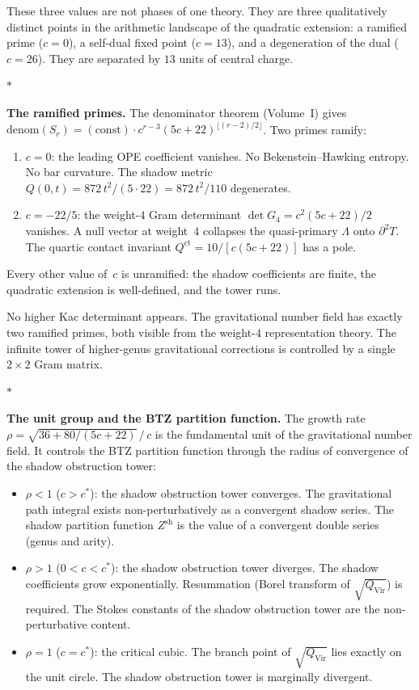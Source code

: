 \documentclass[11pt]{article}
\newcommand{\sep}{\bigskip\begin{center}$*$\end{center}\medskip}
\begin{document}
These three values are not phases of one theory.  They are three
qualitatively distinct points in the arithmetic landscape of the
quadratic extension: a ramified prime ($c = 0$), a self-dual
fixed point ($c = 13$), and a degeneration of the dual
($c = 26$).  They are separated by $13$ units of central charge.

\sep

\noindent\textbf{The ramified primes.}\enspace
The denominator theorem (Volume~I) gives
$\mathrm{denom}(S_r)
= (\mathrm{const})\cdot c^{r-3}(5c{+}22)^{\lfloor(r-2)/2\rfloor}$.
Two primes ramify:
\begin{enumerate}[label=(\roman*),nosep]
\item $c = 0$: the leading OPE coefficient vanishes.  No
  Bekenstein--Hawking entropy.  No bar curvature.  The shadow
  metric $Q(0,t) = 872\,t^2/(5 \cdot 22) = 872\,t^2/110$
  degenerates.
\item $c = -22/5$: the weight-$4$ Gram determinant
  $\det G_4 = c^2(5c{+}22)/2$ vanishes.  A null vector at
  weight~$4$ collapses the quasi-primary $\Lambda$ onto
  $\partial^2 T$.  The quartic contact invariant
  $Q^{\mathrm{ct}} = 10/[c(5c{+}22)]$ has a pole.
\end{enumerate}
Every other value of~$c$ is unramified: the shadow
coefficients are finite, the quadratic extension is
well-defined, and the tower runs.

No higher Kac determinant appears.  The gravitational number
field has exactly two ramified primes, both visible from the
weight-$4$ representation theory.  The infinite tower of
higher-genus gravitational corrections is controlled by a
single $2 \times 2$ Gram matrix.

\sep

\noindent\textbf{The unit group and the BTZ partition function.}\enspace
The growth rate
$\rho = \sqrt{36 + 80/(5c{+}22)}\,/\,c$ is the fundamental
unit of the gravitational number field.  It controls the BTZ
partition function through the radius of convergence of the
shadow obstruction tower:
\begin{itemize}[nosep]
\item $\rho < 1$ ($c > c^*$): the shadow obstruction tower converges.  The
  gravitational path integral exists non-perturbatively as a
  convergent shadow series.  The shadow partition function
  $Z^{\mathrm{sh}}$ is the value of a convergent double series
  (genus and arity).
\item $\rho > 1$ ($0 < c < c^*$): the shadow obstruction tower diverges.
  The shadow coefficients grow exponentially.  Resummation
  (Borel transform of $\sqrt{Q_{\mathrm{Vir}}}$) is required.
  The Stokes constants of the shadow obstruction tower are the
  non-perturbative content.
\item $\rho = 1$ ($c = c^*$): the critical cubic.  The branch
  point of $\sqrt{Q_{\mathrm{Vir}}}$ lies exactly on the unit
  circle.  The shadow obstruction tower is marginally divergent.
\end{itemize}
\end{document}
